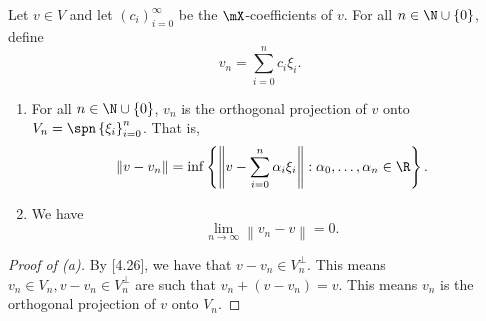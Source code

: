 \documentclass[pmath450]{subfiles}
\begin{document}
    \begin{prop}{}
        Let $v\in V$ and let $\left( c_{i} \right)^{\infty}_{i=0}$ be the $\mX$-coefficients of $v$. For all $n\in\N\cup\left\lbrace 0 \right\rbrace$, define
        \begin{equation*}
            v_n = \sum^{n}_{i=0}c_i\xi_i.
        \end{equation*}
        \begin{enumerate}
            \item For all $n\in\N\cup\left\lbrace 0 \right\rbrace$, $v_n$ is the orthogonal projection of $v$ onto $V_n = \spn\left\lbrace \xi_i \right\rbrace^{n}_{i=0}$. That is,
                \begin{equation*}
                    \left\lVert v-v_n\right\rVert = \inf\left\lbrace \left\lVert v-\sum^{n}_{i=0}\alpha_i\xi_i\right\rVert: \alpha_0,\ldots,\alpha_n\in\R \right\rbrace.
                \end{equation*}

            \item We have
                \begin{equation*}
                    \lim_{n\to\infty} \left\lVert v_n-v\right\rVert = 0.
                \end{equation*}
        \end{enumerate}
    \end{prop}

    \begin{proof}[Proof of (a)]
        By [4.26], we have that $v-v_n\in V_n^{\perp}$. This means $v_n\in V_n, v-v_n\in V_n^{\perp}$ are such that $v_n + \left( v-v_n \right) = v$. This means $v_n$ is the orthogonal projection of $v$ onto $V_n$.
        \qedplacedtrue
    \end{proof}
\end{document}
